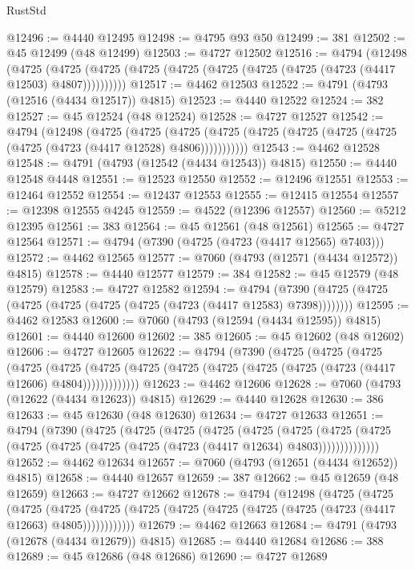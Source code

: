 \begin{lexlean}{RustStd}
\begin{coremodule}
{\begin{coremodule}
{{{{{{{{{{{{{{{{{{{{{{{{{{{{{{{{{{{{{{{{{{{{{{{{{{{{{{{{{{{{@12496 := @4440 @12495
@12498 := @4795 @93 @50
@12499 := 381
@12502 := @45 @12499 (@48 @12499)
@12503 := @4727 @12502
@12516 := @4794
    (@12498
      (@4725 (@4725 (@4725 (@4725 (@4725 (@4725 (@4725 (@4725 (@4723 (@4417 @12503) @4807))))))))))
@12517 := @4462 @12503
@12522 := @4791 (@4793 (@12516 (@4434 @12517)) @4815)
@12523 := @4440 @12522
@12524 := 382
@12527 := @45 @12524 (@48 @12524)
@12528 := @4727 @12527
@12542 := @4794
    (@12498
      (@4725
        (@4725
          (@4725 (@4725 (@4725 (@4725 (@4725 (@4725 (@4725 (@4723 (@4417 @12528) @4806)))))))))))
@12543 := @4462 @12528
@12548 := @4791 (@4793 (@12542 (@4434 @12543)) @4815)
@12550 := @4440 @12548 @4448
@12551 := @12523 @12550
@12552 := @12496 @12551
@12553 := @12464 @12552
@12554 := @12437 @12553
@12555 := @12415 @12554
@12557 := @12398 @12555 @4245
@12559 := @4522 (@12396 @12557)
@12560 := @5212 @12395
@12561 := 383
@12564 := @45 @12561 (@48 @12561)
@12565 := @4727 @12564
@12571 := @4794 (@7390 (@4725 (@4723 (@4417 @12565) @7403)))
@12572 := @4462 @12565
@12577 := @7060 (@4793 (@12571 (@4434 @12572)) @4815)
@12578 := @4440 @12577
@12579 := 384
@12582 := @45 @12579 (@48 @12579)
@12583 := @4727 @12582
@12594 := @4794 (@7390 (@4725 (@4725 (@4725 (@4725 (@4725 (@4725 (@4723 (@4417 @12583) @7398))))))))
@12595 := @4462 @12583
@12600 := @7060 (@4793 (@12594 (@4434 @12595)) @4815)
@12601 := @4440 @12600
@12602 := 385
@12605 := @45 @12602 (@48 @12602)
@12606 := @4727 @12605
@12622 := @4794
    (@7390
      (@4725
        (@4725
          (@4725
            (@4725
              (@4725
                (@4725 (@4725 (@4725 (@4725 (@4725 (@4725 (@4723 (@4417 @12606) @4804)))))))))))))
@12623 := @4462 @12606
@12628 := @7060 (@4793 (@12622 (@4434 @12623)) @4815)
@12629 := @4440 @12628
@12630 := 386
@12633 := @45 @12630 (@48 @12630)
@12634 := @4727 @12633
@12651 := @4794
    (@7390
      (@4725
        (@4725
          (@4725
            (@4725
              (@4725
                (@4725
                  (@4725
                    (@4725 (@4725 (@4725 (@4725 (@4725 (@4723 (@4417 @12634) @4803))))))))))))))
@12652 := @4462 @12634
@12657 := @7060 (@4793 (@12651 (@4434 @12652)) @4815)
@12658 := @4440 @12657
@12659 := 387
@12662 := @45 @12659 (@48 @12659)
@12663 := @4727 @12662
@12678 := @4794
    (@12498
      (@4725
        (@4725
          (@4725
            (@4725 (@4725 (@4725 (@4725 (@4725 (@4725 (@4725 (@4723 (@4417 @12663) @4805))))))))))))
@12679 := @4462 @12663
@12684 := @4791 (@4793 (@12678 (@4434 @12679)) @4815)
@12685 := @4440 @12684
@12686 := 388
@12689 := @45 @12686 (@48 @12686)
@12690 := @4727 @12689
}}}}}}}}}}}}}}}}}}}}}}}}}}}}}}}}}}}}}}}}}}}}}}}}}}}}}}}}}}}}
\end{coremodule}}
\end{coremodule}
\end{lexlean}
